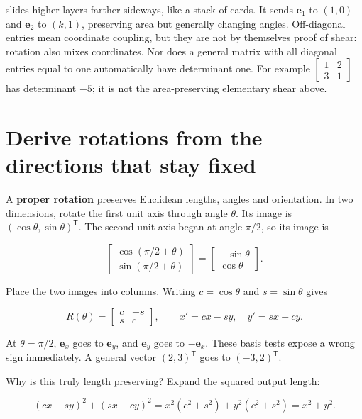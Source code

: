 slides higher layers farther sideways, like a stack of cards. It sends \(\mathbf e_1\) to \((1,0)\) and \(\mathbf e_2\) to \((k,1)\), preserving area but generally changing angles. Off-diagonal entries mean coordinate coupling, but they are not by themselves proof of shear: rotation also mixes coordinates. Nor does a general matrix with all diagonal entries equal to one automatically have determinant one. For example \(\begin{bmatrix}1&2\\3&1\end{bmatrix}\) has determinant \(-5\); it is not the area-preserving elementary shear above.

\section{Derive rotations from the directions that stay fixed}\label{01-foundations-i-ch018-derive-rotations-from-the-directions-that-stay-fixed}

A \textbf{proper rotation} preserves Euclidean lengths, angles and orientation. In two dimensions, rotate the first unit axis through angle \(\theta\). Its image is \((\cos\theta,\sin\theta)^{\mathsf T}\). The second unit axis began at angle \(\pi/2\), so its image is

\[
\begin{bmatrix}\cos(\pi/2+\theta)\\\sin(\pi/2+\theta)\end{bmatrix}
=\begin{bmatrix}-\sin\theta\\\cos\theta\end{bmatrix}.
\]

Place the two images into columns. Writing \(c=\cos\theta\) and \(s=\sin\theta\) gives

\[
R(\theta)=\begin{bmatrix}c&-s\\s&c\end{bmatrix},\qquad
x'=cx-sy,\quad y'=sx+cy.
\]

At \(\theta=\pi/2\), \(\mathbf e_x\) goes to \(\mathbf e_y\), and \(\mathbf e_y\) goes to \(-\mathbf e_x\). These basis tests expose a wrong sign immediately. A general vector \((2,3)^{\mathsf T}\) goes to \((-3,2)^{\mathsf T}\).

Why is this truly length preserving? Expand the squared output length:

\[
(cx-sy)^2+(sx+cy)^2
=x^2(c^2+s^2)+y^2(c^2+s^2)=x^2+y^2.
\]

